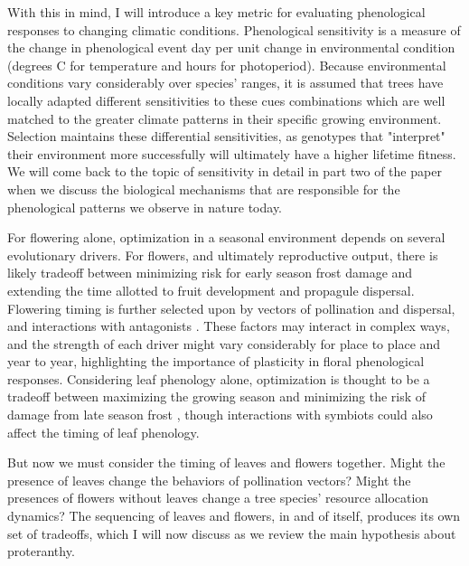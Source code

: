 \documentclass{article}\usepackage[]{graphicx}\usepackage[]{color}
\begin{document}
\par With this in mind, I will introduce a key metric for evaluating phenological responses to changing climatic conditions. Phenological sensitivity is a measure of the change in phenological event day per unit change in environmental condition (degrees C for temperature and hours for photoperiod). Because environmental conditions vary considerably over species' ranges, it is assumed that trees have locally adapted different sensitivities to these cues combinations which are well matched to the greater climate patterns in their specific growing environment. Selection maintains these differential sensitivities, as genotypes that "interpret" their environment more successfully will ultimately have a higher lifetime fitness. We will come back to the topic of sensitivity in detail in part two of the paper when we discuss the biological mechanisms that are responsible for the phenological patterns we observe in nature today.
\par For flowering alone, optimization in a seasonal environment depends on several evolutionary drivers. For flowers, and ultimately reproductive output, there is likely tradeoff between minimizing risk for early season frost damage and extending the time allotted to fruit development and propagule dispersal. Flowering timing is further selected upon by vectors of pollination and dispersal, and interactions with antagonists \citep{Austen2017}. These factors may interact in complex ways, and the strength of each driver might vary considerably for place to place and year to year, highlighting the importance of plasticity in floral phenological responses. Considering leaf phenology alone, optimization is thought to be a tradeoff between maximizing the growing season and minimizing the risk of damage from late season frost \citep{Kramer1995}, though interactions with symbiots could also affect the timing of leaf phenology. 
\par But now we must consider the timing of leaves and flowers together. Might the presence of leaves change the behaviors of pollination vectors? Might the presences of flowers without leaves change a tree species' resource allocation dynamics? The sequencing of leaves and flowers, in and of itself, produces its own set of tradeoffs, which I will now discuss as we review the main hypothesis about proteranthy.
\end{document}
